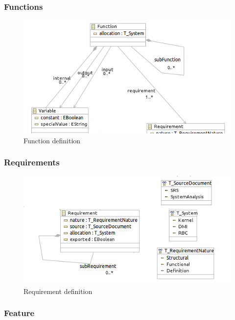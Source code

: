 \subsubsection{Functions}


\begin{figure}[ht]
  \centering
  \includegraphics{DataModel/Function1.png}
  \caption{Function definition}
  \label{fig:function}
\end{figure}

\subsubsection{Requirements}


\begin{figure}[ht]
  \centering
  \includegraphics{DataModel/Requirement1.png}
  \caption{Requirement definition}
  \label{fig:requirement}
\end{figure}


\subsubsection{Feature}


